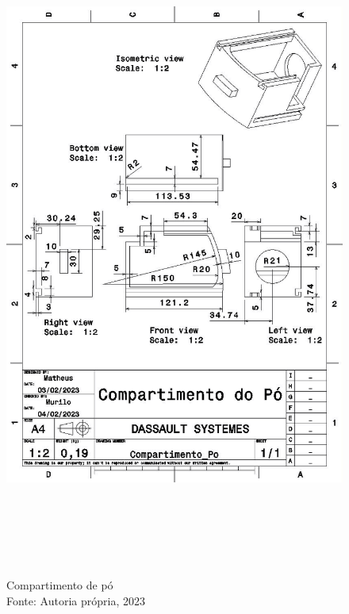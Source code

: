\newpage
\pagebreak
\begin{figure}[h!]
\centering
\includegraphics[width=16cm,height=22cm]{figuras/Compartimento_Po.jpg}
\caption{Compartimento de pó\\Fonte: Autoria própria, 2023}
\label{Compartimento_Po}
\end{figure}

